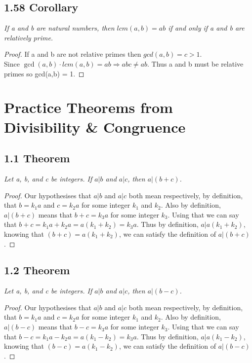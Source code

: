 \documentclass{article}
\begin{document}
\subsection*{1.58 Corollary} 
\quad \textit{If a and b are natural numbers, then $lcm(a,b) = ab$ if and only if a and b are relatively prime.}

\begin{proof}
If a and b are not relative primes then $gcd(a,b) = c > 1$.\\
Since $\gcd(a,b) \cdot lcm(a,b) = ab \Rightarrow abc \neq ab$. Thus a and b must be relative primes so gcd(a,b) = 1.
\end{proof}

\section*{Practice Theorems from Divisibility \& Congruence}

\subsection*{1.1 Theorem} 
\quad \textit{Let a, b, and c be integers. If $a \vert b$ and $a \vert c$, then $a \vert (b+c)$.}

\begin{proof}
Our hypothesises that $a \vert b$ and $a \vert c$ both mean respectively, by definition, that $b = k_1a$ and $c = k_2a$ for some integer $k_1$ and $k_2$. Also by definition, $a \vert (b+c)$ means that $b + c = k_3a$ for some integer $k_3$. Using that we can say that $b + c = k_1a + k_2a = a(k_1+k_2) = k_3a$. Thus by definition, $a \vert a(k_1+k_2)$, knowing that $(b+c) = a(k_1+k_2)$, we can satisfy the definition of $a \vert (b+c)$.
\end{proof}

\subsection*{1.2 Theorem} 
\quad \textit{Let a, b, and c be integers. If $a \vert b$ and $a \vert c$, then $a \vert (b-c)$.}

\begin{proof}
Our hypothesises that $a \vert b$ and $a \vert c$ both mean respectively, by definition, that $b = k_1a$ and $c = k_2a$ for some integer $k_1$ and $k_2$. Also by definition, $a \vert (b-c)$ means that $b - c = k_3a$ for some integer $k_3$. Using that we can say that $b - c = k_1a - k_2a = a(k_1 - k_2) = k_3a$. Thus by definition, $a \vert a(k_1 - k_2)$, knowing that $(b - c) = a(k_1 - k_2)$, we can satisfy the definition of $a \vert (b - c)$.
\end{proof}
\end{document}
